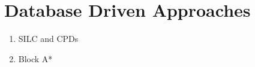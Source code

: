\section{Database Driven Approaches}
\label{cha::lit::db}

\begin{enumerate}
\item{SILC and CPDs}
\item{Block A*}
\end{enumerate}

